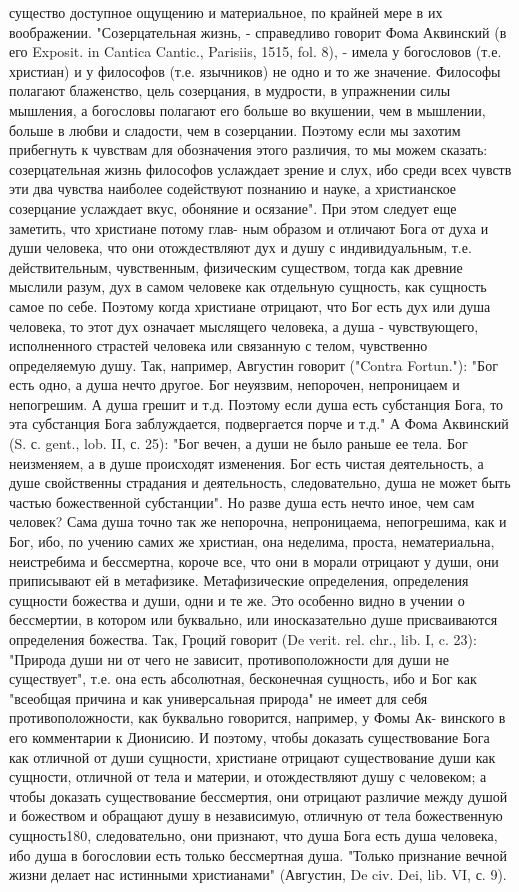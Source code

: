 \documentclass[12pt,oneside]{book}
\begin{document}
существо доступное ощущению и материальное, по крайней мере в их воображении. "Созерцательная жизнь, - справедливо говорит Фома Аквинский (в его Exposit. in Cantica Cantic., Parisiis, 1515, fol. 8), - имела у богословов (т.е. христиан) и у философов (т.е. язычников) не одно и то же значение. Философы полагают блаженство, цель созерцания, в мудрости, в упражнении силы мышления, а богословы полагают его больше во вкушении, чем в мышлении, больше в любви и сладости, чем в созерцании. Поэтому если мы захотим прибегнуть к чувствам для обозначения этого различия, то мы можем сказать: созерцательная жизнь философов услаждает зрение и слух, ибо среди всех чувств эти два чувства наиболее содействуют познанию и науке, а христианское созерцание услаждает вкус, обоняние и осязание". При этом следует еще заметить, что христиане потому глав- ным образом и отличают Бога от духа и души человека, что они отождествляют дух и душу с индивидуальным, т.е. действительным, чувственным, физическим существом, тогда как древние мыслили разум, дух в самом человеке как отдельную сущность, как сущность самое по себе. Поэтому когда христиане отрицают, что Бог есть дух или душа человека, то этот дух означает мыслящего человека, а душа - чувствующего, исполненного страстей человека или связанную с телом, чувственно определяемую душу. Так, например, Августин говорит ("Contra Fortun."): "Бог есть одно, а душа нечто другое. Бог неуязвим, непорочен, непроницаем и непогрешим. А душа грешит и т.д. Поэтому если душа есть субстанция Бога, то эта субстанция Бога заблуждается, подвергается порче и т.д." А Фома Аквинский (S. с. gent., lob. II, с. 25): "Бог вечен, а души не было раньше ее тела. Бог неизменяем, а в душе происходят изменения. Бог есть чистая деятельность, а душе свойственны страдания и деятельность, следовательно, душа не может быть частью божественной субстанции". Но разве душа есть нечто иное, чем сам человек? Сама душа точно так же непорочна, непроницаема, непогрешима, как и Бог, ибо, по учению самих же христиан, она неделима, проста, нематериальна, неистребима и бессмертна, короче все, что они в морали отрицают у души, они приписывают ей в метафизике. Метафизические определения, определения сущности божества и души, одни и те же. Это особенно видно в учении о бессмертии, в котором или буквально, или иносказательно душе присваиваются определения божества. Так, Гроций говорит (De verit. rel. chr., lib. I, c. 23): "Природа души ни от чего не зависит, противоположности для души не существует", т.е. она есть абсолютная, бесконечная сущность, ибо и Бог как "всеобщая причина и как универсальная природа" не имеет для себя противоположности, как буквально говорится, например, у Фомы Ак- винского в его комментарии к Дионисию. И поэтому, чтобы доказать существование Бога как отличной от души сущности, христиане отрицают существование души как сущности, отличной от тела и материи, и отождествляют душу с человеком; а чтобы доказать существование бессмертия, они отрицают различие между душой и божеством и обращают душу в независимую, отличную от тела божественную сущность180, следовательно, они признают, что душа Бога есть душа человека, ибо душа в богословии есть только бессмертная душа. "Только признание вечной жизни делает нас истинными христианами" (Августин, De civ. Dei, lib. VI, с. 9). 
\end{document}
